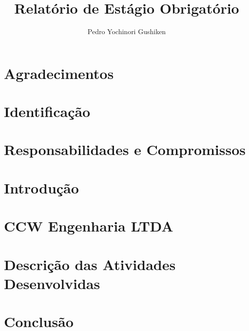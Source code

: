 \documentclass[11pt]{report}
\title{Relatório de Estágio Obrigatório}
\author{Pedro Yochinori Gushiken}
\begin{document}
\maketitle
\tableofcontents

\chapter{Agradecimentos}


\chapter{Identificação}


\chapter{Responsabilidades e Compromissos}


\chapter{Introdução}


\chapter{CCW Engenharia LTDA}


\chapter{Descrição das Atividades Desenvolvidas}


\chapter{Conclusão}

\end{document}
